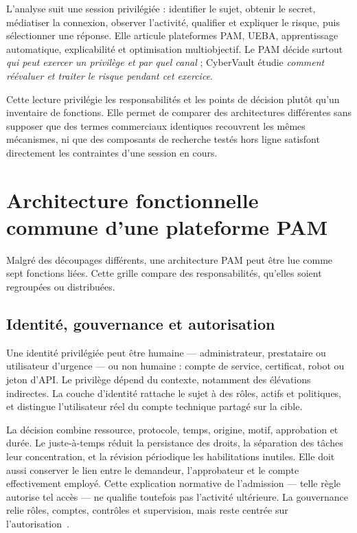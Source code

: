 \documentclass[11pt,a4paper,oneside]{report}
\theoremstyle{definition}
\theoremstyle{plain}
\begin{document}
L'analyse suit une session privilégiée : identifier le sujet, obtenir le secret, médiatiser la connexion, observer l'activité, qualifier et expliquer le risque, puis sélectionner une réponse. Elle articule plateformes PAM, UEBA, apprentissage automatique, explicabilité et optimisation multiobjectif. Le PAM décide surtout \emph{qui peut exercer un privilège et par quel canal} ; CyberVault étudie \emph{comment réévaluer et traiter le risque pendant cet exercice}.

Cette lecture privilégie les responsabilités et les points de décision plutôt qu'un inventaire de fonctions. Elle permet de comparer des architectures différentes sans supposer que des termes commerciaux identiques recouvrent les mêmes mécanismes, ni que des composants de recherche testés hors ligne satisfont directement les contraintes d'une session en cours.

\section{Architecture fonctionnelle commune d'une plateforme PAM}
\label{sec:domain-architecture}

Malgré des découpages différents, une architecture PAM peut être lue comme sept fonctions liées. Cette grille compare des responsabilités, qu'elles soient regroupées ou distribuées.

\subsection{Identité, gouvernance et autorisation}

Une identité privilégiée peut être humaine --- administrateur, prestataire ou utilisateur d'urgence --- ou non humaine : compte de service, certificat, robot ou jeton d'API. Le privilège dépend du contexte, notamment des élévations indirectes. La couche d'identité rattache le sujet à des rôles, actifs et politiques, et distingue l'utilisateur réel du compte technique partagé sur la cible.

La décision combine ressource, protocole, temps, origine, motif, approbation et durée. Le juste-à-temps réduit la persistance des droits, la séparation des tâches leur concentration, et la révision périodique les habilitations inutiles. Elle doit aussi conserver le lien entre le demandeur, l'approbateur et le compte effectivement employé. Cette explication normative de l'admission --- telle règle autorise tel accès --- ne qualifie toutefois pas l'activité ultérieure. La gouvernance relie rôles, comptes, contrôles et supervision, mais reste centrée sur l'autorisation~\cite{ref1,ref2}.
\end{document}
